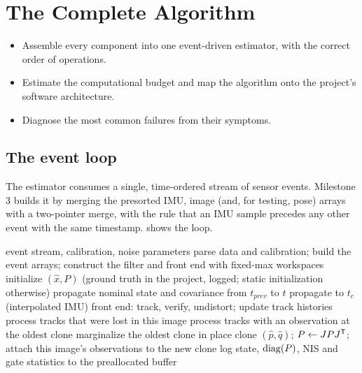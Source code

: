 \chapter{The Complete Algorithm}
\label{ch:fullalgo}

\begin{objectives}
\begin{itemize}
  \item Assemble every component into one event-driven estimator, with the correct order of operations.
  \item Estimate the computational budget and map the algorithm onto the project's software architecture.
  \item Diagnose the most common failures from their symptoms.
\end{itemize}
\end{objectives}

\section{The event loop}

The estimator consumes a single, time-ordered stream of sensor events. Milestone 3 builds it by merging the presorted IMU,
image (and, for testing, pose) arrays with a two-pointer merge, with the rule that an IMU sample precedes any other event
with the same timestamp.  shows the loop.

\begin{algorithm}[t]
\caption{Monocular MSCKF}
\label{alg:msckf}
\begin{algorithmic}[1]
\Require event stream, calibration, noise parameters
\State parse data and calibration; build the event arrays; construct the filter and front end with fixed-max workspaces
\State initialize $(\hat x, P)$ (ground truth in the project, logged; static initialization otherwise)
    \State propagate nominal state and covariance from $t_{prev}$ to $t$ 
    \State propagate to $t_c$ (interpolated IMU) 
    \State front end: track, verify, undistort; update track histories 
    \State process tracks that were lost in this image 
      \State process tracks with an observation at the oldest clone
      \State marginalize the oldest clone in place 
    \EndIf
    \State clone $(\hat p, \hat q)$; $P \gets JPJ^{\mathsf{T}}$; attach this image's observations to the new clone
  \EndIf
  \State log state, $\operatorname{diag}(P)$, NIS and gate statistics to the preallocated buffer
\EndFor
\end{algorithmic}
\end{algorithm}

